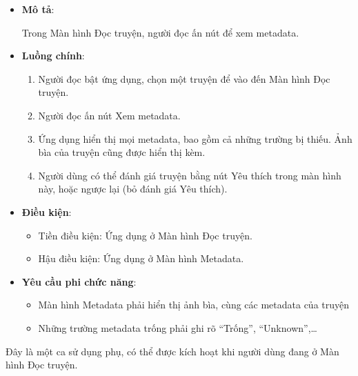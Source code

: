 \begin{itemize}
  \item
        \textbf{Mô tả}:

        Trong Màn hình Đọc truyện, người đọc ấn nút để xem metadata.
  \item
        \textbf{Luồng chính}:

        \begin{enumerate}
          \def\labelenumi{\arabic{enumi}.}
          
          \item
                Người đọc bật ứng dụng, chọn một truyện để vào đến Màn hình Đọc
                truyện.
          \item
                Người đọc ấn nút Xem metadata.
          \item
                Ứng dụng hiển thị mọi metadata, bao gồm cả những trường bị thiếu.
                Ảnh bìa của truyện cũng được hiển thị kèm.
          \item
                Người dùng có thể đánh giá truyện bằng nút Yêu thích trong màn hình
                này, hoặc ngược lại (bỏ đánh giá Yêu thích).
        \end{enumerate}
  \item
        \textbf{Điều kiện}:

        \begin{itemize}
          
          \item
                Tiền điều kiện: Ứng dụng ở Màn hình Đọc truyện.
          \item
                Hậu điều kiện: Ứng dụng ở Màn hình Metadata.
        \end{itemize}
  \item
        \textbf{Yêu cầu phi chức năng}:

        \begin{itemize}
          
          \item
                Màn hình Metadata phải hiển thị ảnh bìa, cùng các metadata của
                truyện
          \item
                Những trường metadata trống phải ghi rõ ``Trống'',
                ``Unknown'',\ldots{}
        \end{itemize}
\end{itemize}

Đây là một ca sử dụng phụ, có thể được kích hoạt khi người dùng đang ở
Màn hình Đọc truyện.

